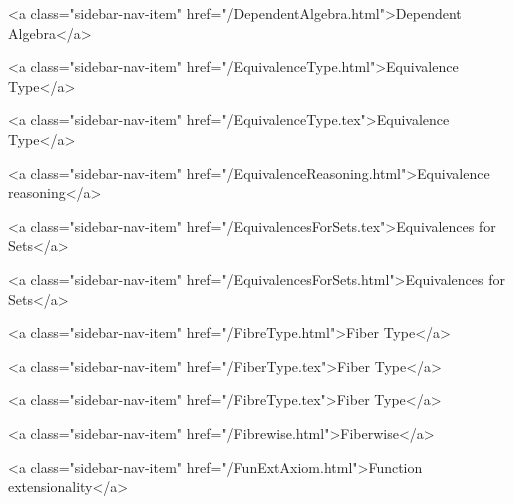       
    
      
        
          <a class="sidebar-nav-item" href="/DependentAlgebra.html">Dependent Algebra</a>
        
      
    
      
        
          <a class="sidebar-nav-item" href="/EquivalenceType.html">Equivalence Type</a>
        
      
    
      
        
          <a class="sidebar-nav-item" href="/EquivalenceType.tex">Equivalence Type</a>
        
      
    
      
        
          <a class="sidebar-nav-item" href="/EquivalenceReasoning.html">Equivalence reasoning</a>
        
      
    
      
        
          <a class="sidebar-nav-item" href="/EquivalencesForSets.tex">Equivalences for Sets</a>
        
      
    
      
        
          <a class="sidebar-nav-item" href="/EquivalencesForSets.html">Equivalences for Sets</a>
        
      
    
      
        
          <a class="sidebar-nav-item" href="/FibreType.html">Fiber Type</a>
        
      
    
      
        
          <a class="sidebar-nav-item" href="/FiberType.tex">Fiber Type</a>
        
      
    
      
        
          <a class="sidebar-nav-item" href="/FibreType.tex">Fiber Type</a>
        
      
    
      
        
          <a class="sidebar-nav-item" href="/Fibrewise.html">Fiberwise</a>
        
      
    
      
        
          <a class="sidebar-nav-item" href="/FunExtAxiom.html">Function extensionality</a>
        
